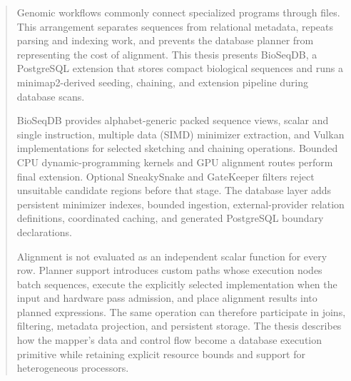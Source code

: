\begin{abstract}
    \vfilneg
    \enlargethispage{4\baselineskip}
    Genomic workflows commonly connect specialized programs through files.
    This arrangement separates sequences from relational metadata, repeats
    parsing and indexing work, and prevents the database planner from
    representing the cost of alignment. This thesis presents BioSeqDB, a
    PostgreSQL extension that stores compact biological sequences and runs a
    minimap2-derived seeding, chaining, and extension pipeline during database
    scans.

    BioSeqDB provides alphabet-generic packed sequence views, scalar and
    single instruction, multiple data (SIMD) minimizer extraction, and Vulkan
    implementations for selected sketching and chaining operations. Bounded
    CPU dynamic-programming kernels and GPU alignment routes perform final
    extension. Optional SneakySnake
    and GateKeeper filters reject unsuitable candidate regions before that
    stage. The database layer adds persistent minimizer indexes, bounded
    ingestion, external-provider relation definitions, coordinated caching,
    and generated PostgreSQL boundary declarations.

    Alignment is not evaluated as an independent scalar function for every
    row. Planner support introduces custom paths whose execution nodes batch
    sequences, execute the explicitly selected implementation when the input
    and hardware pass admission, and place alignment results into planned
    expressions. The same
    operation can therefore participate in joins, filtering, metadata
    projection, and persistent storage. The thesis describes how the mapper's
    data and control flow become a database execution primitive while retaining
    explicit resource bounds and support for heterogeneous processors.
\end{abstract}

\makeatletter
\renewcommand*\l@section{\@dottedtocline{1}{1.5em}{3.0em}}
\renewcommand*\l@subsection{\@dottedtocline{2}{3.8em}{4.0em}}
\renewcommand*\l@subsubsection{\@dottedtocline{3}{7.0em}{5.0em}}
\makeatother
\tableofcontents


